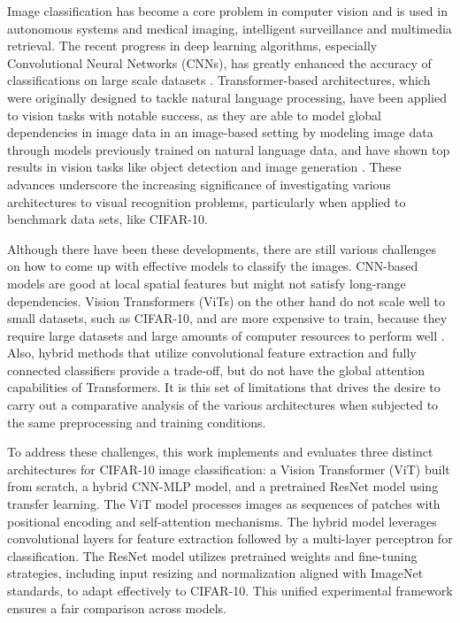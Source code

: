 \documentclass[conference]{IEEEtran}
\begin{document}
Image classification has become a core problem in computer vision and is used in autonomous systems and medical imaging, intelligent surveillance and multimedia retrieval. The recent progress in deep learning algorithms, especially Convolutional Neural Networks (CNNs), has greatly enhanced the accuracy of classifications on large scale datasets \cite{krizhevsky2012imagenet, he2016deep}. Transformer-based architectures, which were originally designed to tackle natural language processing, have been applied to vision tasks with notable success, as they are able to model global dependencies in image data in an image-based setting by modeling image data through models previously trained on natural language data, and have shown top results in vision tasks like object detection and image generation \cite{dosovitskiy2021image}. These advances underscore the increasing significance of investigating various architectures to visual recognition problems, particularly when applied to benchmark data sets, like CIFAR-10.

Although there have been these developments, there are still various challenges on how to come up with effective models to classify the images. CNN-based models are good at local spatial features but might not satisfy long-range dependencies. Vision Transformers (ViTs) on the other hand do not scale well to small datasets, such as CIFAR-10, and are more expensive to train, because they require large datasets and large amounts of computer resources to perform well \cite{touvron2021training}. Also, hybrid methods that utilize convolutional feature extraction and fully connected classifiers provide a trade-off, but do not have the global attention capabilities of Transformers. It is this set of limitations that drives the desire to carry out a comparative analysis of the various architectures when subjected to the same preprocessing and training conditions.

To address these challenges, this work implements and evaluates three distinct architectures for CIFAR-10 image classification: a Vision Transformer (ViT) built from scratch, a hybrid CNN-MLP model, and a pretrained ResNet model using transfer learning. The ViT model processes images as sequences of patches with positional encoding and self-attention mechanisms. The hybrid model leverages convolutional layers for feature extraction followed by a multi-layer perceptron for classification. The ResNet model utilizes pretrained weights and fine-tuning strategies, including input resizing and normalization aligned with ImageNet standards, to adapt effectively to CIFAR-10. This unified experimental framework ensures a fair comparison across models.
\end{document}
